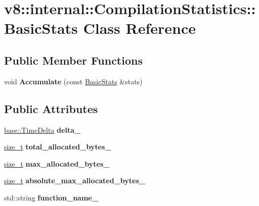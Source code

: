 \hypertarget{classv8_1_1internal_1_1CompilationStatistics_1_1BasicStats}{}\section{v8\+:\+:internal\+:\+:Compilation\+Statistics\+:\+:Basic\+Stats Class Reference}
\label{classv8_1_1internal_1_1CompilationStatistics_1_1BasicStats}
\subsection*{Public Member Functions}
\begin{DoxyCompactItemize}
\item 
\mbox{\label{classv8_1_1internal_1_1CompilationStatistics_1_1BasicStats_a94b970ba3ece65f2c7490949e54d76c3}} 
void {\bfseries Accumulate} (const \mbox{\hyperlink{classv8_1_1internal_1_1CompilationStatistics_1_1BasicStats}{Basic\+Stats}} \&stats)
\end{DoxyCompactItemize}
\subsection*{Public Attributes}
\begin{DoxyCompactItemize}
\item 
\mbox{\label{classv8_1_1internal_1_1CompilationStatistics_1_1BasicStats_a927df9d6f97d65c3a2aedad57e818c94}} 
\mbox{\hyperlink{classv8_1_1base_1_1TimeDelta}{base\+::\+Time\+Delta}} {\bfseries delta\+\_\+}
\item 
\mbox{\label{classv8_1_1internal_1_1CompilationStatistics_1_1BasicStats_a442ab48eb38a620c9254ed9754560909}} 
\mbox{\hyperlink{classsize__t}{size\+\_\+t}} {\bfseries total\+\_\+allocated\+\_\+bytes\+\_\+}
\item 
\mbox{\label{classv8_1_1internal_1_1CompilationStatistics_1_1BasicStats_ab0a41a6a47d3f12549fba351d714e546}} 
\mbox{\hyperlink{classsize__t}{size\+\_\+t}} {\bfseries max\+\_\+allocated\+\_\+bytes\+\_\+}
\item 
\mbox{\label{classv8_1_1internal_1_1CompilationStatistics_1_1BasicStats_a29cc261980ab93281332774e1b98f361}} 
\mbox{\hyperlink{classsize__t}{size\+\_\+t}} {\bfseries absolute\+\_\+max\+\_\+allocated\+\_\+bytes\+\_\+}
\item 
\mbox{\label{classv8_1_1internal_1_1CompilationStatistics_1_1BasicStats_a12a3c0e593f62792c029d9ab0cce50c8}} 
std\+::string {\bfseries function\+\_\+name\+\_\+}
\end{DoxyCompactItemize}


